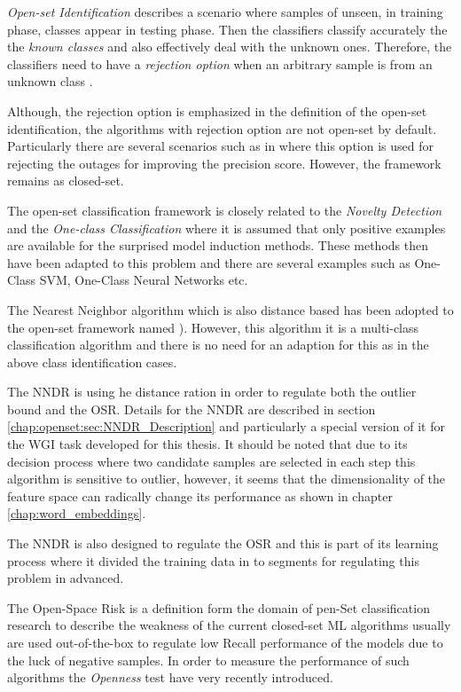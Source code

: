 \begin{definition}{\textit{Open-set Identification}}
describes a scenario where samples of unseen, in training phase, classes appear in testing phase. Then the classifiers classify accurately the the \textit{known classes} and also effectively deal with the unknown ones. Therefore, the classifiers need to have a \textit{rejection option} when an arbitrary sample is from an unknown class \parencite{geng2018recent}.
\end{definition}
    
Although, the rejection option is emphasized in the definition of the open-set identification, the algorithms with rejection option are not open-set by default. Particularly there are several scenarios such as in \parencite{onan2018ensemble} where this option is used for rejecting the outages for improving the precision score. However, the framework remains as closed-set.
    
The open-set classification framework is closely related to the \textit{Novelty Detection} and the \textit{One-class Classification} where it is assumed that only positive examples are available for the surprised model induction methods. These methods then have been adapted to this problem and there are several examples such as One-Class SVM, One-Class Neural Networks etc.

The Nearest Neighbor algorithm which is also distance based has been adopted to the open-set framework named ). However, this algorithm it is a multi-class classification algorithm and there is no need for an adaption for this as in the above class identification cases.

The NNDR is using he distance ration in order to regulate both the outlier bound and the OSR. Details for the NNDR are described in section \ref{chap:openset:sec:NNDR_Description} and particularly a special version of it for the WGI task developed for this thesis. It should be noted that due to its decision process where two candidate samples are selected in each step this algorithm is sensitive to outlier, however, it seems that the dimensionality of the feature space can radically change its performance as shown in chapter \ref{chap:word_embeddings}.

The NNDR is also designed to regulate the OSR and this is part of its learning process where it divided the training data in to segments for regulating this problem in advanced. 

The {Open-Space Risk} is a definition form the domain of pen-Set classification research to describe the weakness of the current closed-set ML algorithms usually are used out-of-the-box to regulate low Recall performance of the models due to the luck of negative samples. In order to measure the performance of such algorithms the \textit{Openness} test have very recently introduced. 


